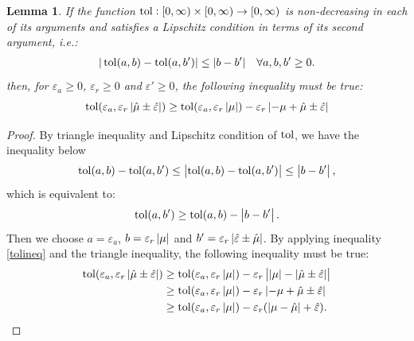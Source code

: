 \documentclass{iitthesis}
\newtheorem{lemma}[theorem]{Lemma}
\theoremstyle{definition}
\begin{document}
\begin{lemma}\label{cost1}
If the function $\operatorname{tol}: [0, \infty) \times [0, \infty) \to [0,\infty)$ is non-decreasing in each of its arguments and satisfies a Lipschitz condition in terms of its second argument, i.e.:
\begin{align}
|\operatorname{tol} (a,b)-\operatorname{tol} (a,b')| \leq |b-b'| \quad \forall a,b,b' \geq 0.
\end{align}
then, for $\varepsilon_a \geq 0$, $\varepsilon_r\geq 0$ and $\varepsilon' \geq 0$, the following inequality must be true:
$$\operatorname{tol} (\varepsilon_a, \varepsilon_r \left \lvert \hat{\mu} \pm\hat{\varepsilon}  \right \rvert) \geq \operatorname{tol}(\varepsilon_a,\varepsilon_r \left \lvert \mu \right \rvert)-\varepsilon_r \left \lvert -\mu+\hat{\mu} \pm\hat{\varepsilon} \right \rvert$$
\end{lemma}
\begin{proof}
By triangle inequality and Lipschitz condition of $\operatorname{tol}$, we have the inequality below
 $$\operatorname{tol}(a,b) -\operatorname{tol}(a,b') \leq \left \lvert \operatorname{tol}(a,b) -\operatorname{tol}(a,b') \right \rvert \leq \left \lvert b-b' \right \rvert,$$
which is equivalent to:
\begin{align}\label{tolineq}
\operatorname{tol}(a,b') \geq \operatorname{tol}(a,b)-\left \lvert b-b' \right \rvert.
\end{align}
Then we choose $a = \varepsilon_a$, $b =\varepsilon_r\left \lvert \mu \right \rvert$ and $b'=\varepsilon_r\left \lvert \hat{\varepsilon} \pm \hat{\mu} \right \rvert$. By applying inequality \eqref{tolineq} and the triangle inequality, the following inequality must be true:
\begin{align}
\operatorname{tol} (\varepsilon_a, \varepsilon_r \left \lvert \hat{\mu} \pm\hat{\varepsilon} \right \rvert) &
 \geq \operatorname{tol}(\varepsilon_a,\varepsilon_r \left \lvert \mu \right \rvert)-\varepsilon_r \left \lvert \left \lvert \mu \right \rvert-\left \lvert \hat{\mu}  \pm \hat{\varepsilon} \right \rvert \right \rvert \\&\geq \operatorname{tol}(\varepsilon_a,\varepsilon_r \left \lvert \mu \right \rvert)-\varepsilon_r \left \lvert -\mu+\hat{\mu} \pm \hat{\varepsilon} \right \rvert \\&
 \geq \operatorname{tol}(\varepsilon_a,\varepsilon_r \left \lvert \mu \right \rvert)-\varepsilon_r (\left \lvert \mu-\hat{\mu} \right \rvert + \hat{\varepsilon}).
  \label{lipstol}
\end{align}
\end{proof}
\end{document}
